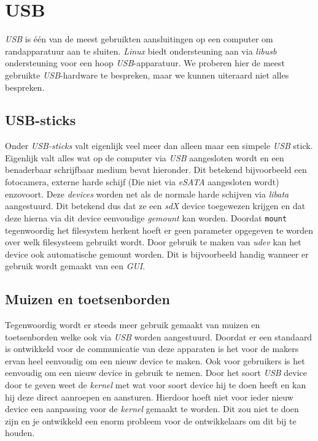 \section{USB}
\emph{USB} is \'{e}\'{e}n van de meest gebruikten aansluitingen op een computer om randapparatuur aan te sluiten. \emph{Linux} biedt ondersteuning aan via \emph{libusb} ondersteuning voor een hoop \emph{USB}-apparatuur. We proberen hier de meest gebruikte \emph{USB}-hardware te bespreken, maar we kunnen uiteraard niet alles bespreken. 
\subsection{USB-sticks}
Onder \emph{USB-sticks} valt eigenlijk veel meer dan alleen maar een simpele \emph{USB} stick. Eigenlijk valt alles wat op de computer via \emph{USB} aangesloten wordt en een benaderbaar schrijfbaar medium bevat hieronder. Dit betekend bijvoorbeeld een fotocamera, externe harde schijf (Die niet via \emph{eSATA} aangesloten wordt) enzovoort. Deze \emph{devices} worden net als de normale harde schijven via \emph{libata} aangestuurd. Dit betekend dus dat ze een \emph{sdX} device toegewezen krijgen en dat deze hierna via dit device eenvoudige \emph{gemount} kan worden. Doordat \texttt{mount} tegenwoordig het filesystem herkent hoeft er geen parameter opgegeven te worden over welk filesysteem gebruikt wordt. Door gebruik te maken van \emph{udev} kan het device ook automatische gemount worden. Dit is bijvoorbeeld handig wanneer er gebruik wordt gemaakt van een \emph{GUI}.

\subsection{Muizen en toetsenborden}
Tegenwoordig wordt er steeds meer gebruik gemaakt van muizen en toetsenborden welke ook via \emph{USB} worden aangestuurd. Doordat er een standaard is ontwikkeld voor de communicatie van deze apparaten is het voor de makers ervan heel eenvoudig om een nieuw device te maken. Ook voor gebruikers is het eenvoudig om een nieuw device in gebruik te nemen. Door het soort \emph{USB} device door te geven weet de \emph{kernel} met wat voor soort device hij te doen heeft en kan hij deze direct aanroepen en aansturen. Hierdoor hoeft niet voor ieder nieuw device een aanpassing voor de \emph{kernel} gemaakt te worden. Dit zou niet te doen zijn en je ontwikkeld een enorm probleem voor de ontwikkelaars om dit bij te houden. 

